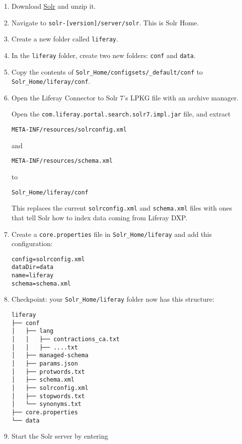 \begin{enumerate}
\def\labelenumi{\arabic{enumi}.}
\item
  Download
  \href{http://archive.apache.org/dist/lucene/solr/7.5.0/}{Solr} and
  unzip it.
\item
  Navigate to \texttt{solr-{[}version{]}/server/solr}. This is Solr
  Home.
\item
  Create a new folder called \texttt{liferay}.
\item
  In the \texttt{liferay} folder, create two new folders: \texttt{conf}
  and \texttt{data}.
\item
  Copy the contents of \texttt{Solr\_Home/configsets/\_default/conf} to
  \texttt{Solr\_Home/liferay/conf}.
\item
  Open the Liferay Connector to Solr 7's LPKG file with an archive
  manager.

  Open the \texttt{com.liferay.portal.search.solr7.impl.jar} file, and
  extract

\begin{verbatim}
META-INF/resources/solrconfig.xml
\end{verbatim}

  and

\begin{verbatim}
META-INF/resources/schema.xml
\end{verbatim}

  to

\begin{verbatim}
Solr_Home/liferay/conf
\end{verbatim}

  This replaces the current \texttt{solrconfig.xml} and
  \texttt{schema.xml} files with ones that tell Solr how to index data
  coming from Liferay DXP.
\item
  Create a \texttt{core.properties} file in \texttt{Solr\_Home/liferay}
  and add this configuration:

\begin{verbatim}
config=solrconfig.xml
dataDir=data
name=liferay
schema=schema.xml
\end{verbatim}
\item
  Checkpoint: your \texttt{Solr\_Home/liferay} folder now has this
  structure:

\begin{verbatim}
liferay
├── conf
│   ├── lang
│   │   ├── contractions_ca.txt
│   │   ├── ....txt
│   ├── managed-schema
│   ├── params.json
│   ├── protwords.txt
│   ├── schema.xml
│   ├── solrconfig.xml
│   ├── stopwords.txt
│   └── synonyms.txt
├── core.properties
└── data
\end{verbatim}
\item
  Start the Solr server by entering


\end{enumerate}
